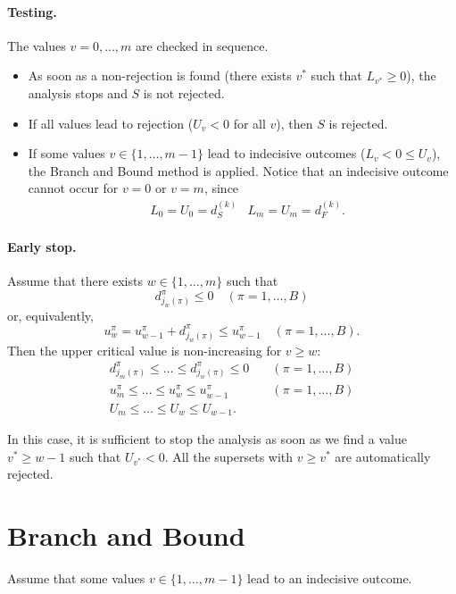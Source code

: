 \documentclass[11pt,a4paper,openright,twoside]{article}
\begin{document}
\paragraph{Testing.}
The values $v=0,\ldots, m$ are checked in sequence.
\begin{itemize}
\item As soon as a non-rejection is found (there exists $v^*$ such that $L_{v^*}\geq 0$), the analysis stops and $S$ is not rejected.
\item If all values lead to rejection ($U_v<0$ for all $v$), then $S$ is rejected.
\item If some values $v\in \{1,\ldots,m-1\}$ lead to indecisive outcomes ($L_v < 0\leq U_v$), the Branch and Bound method is applied. Notice that an indecisive outcome cannot occur for $v=0$ or $v=m$, since
\begin{align*}
& L_0=U_0=d_S^{(k)} & L_m=U_m=d_F^{(k)}.
\end{align*}
\end{itemize}



\paragraph{Early stop.} Assume that there exists $w\in\{1,\ldots,m\}$ such that
\[d_{j_w(\pi)}^\pi\leq 0\quad (\pi=1,\ldots,B)\]
or, equivalently,
\[u_w^\pi =u_{w-1}^\pi +d_{j_w(\pi)}^\pi\leq u_{w-1}^\pi\quad (\pi=1,\ldots,B).\]
Then the upper critical value is non-increasing for $v\geq w$:
\begin{align*}
d_{j_m(\pi)}^\pi\leq \ldots \leq d_{j_w(\pi)}^\pi \leq 0&\quad(\pi=1,\ldots,B)\\
u_m^\pi \leq\ldots\leq u_w^\pi\leq u_{w-1}^\pi&\quad(\pi=1,\ldots,B)\\
U_m \leq\ldots\leq U_w\leq U_{w-1}. &
\end{align*}

In this case, it is sufficient to stop the analysis as soon as we find a value $v^*\geq w-1$ such that $U_{v^*}<0$. All the supersets with $v\geq v^*$ are automatically rejected.





\vspace{10mm}

\section{Branch and Bound}
Assume that some values $v\in\{1,\ldots,m-1\}$ lead to an indecisive outcome. 
\end{document}
